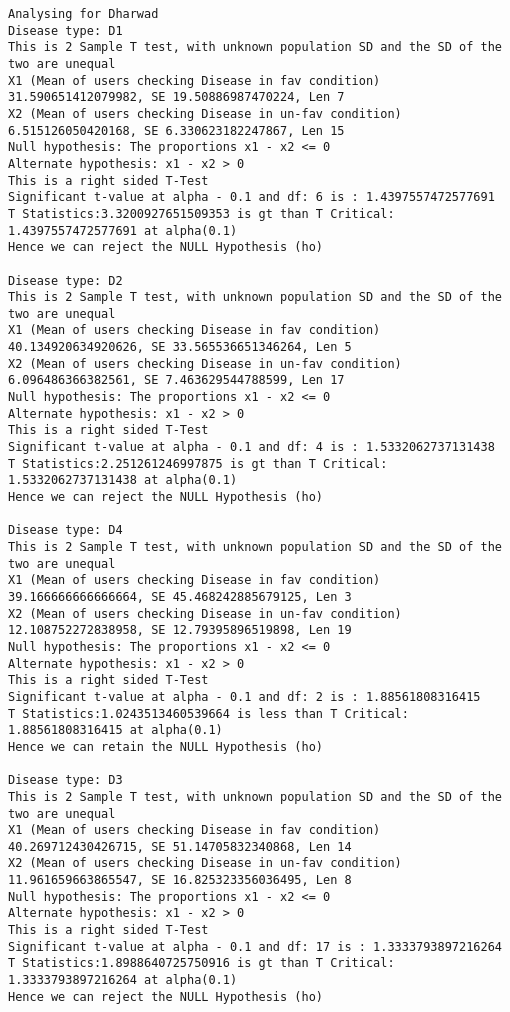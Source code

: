 \documentclass[11pt]{article}
\begin{document}
    \begin{Verbatim}[commandchars=\\\{\}]
Analysing for Dharwad
Disease type: D1
This is 2 Sample T test, with unknown population SD and the SD of the two are unequal
X1 (Mean of users checking Disease in fav condition) 31.590651412079982, SE 19.50886987470224, Len 7
X2 (Mean of users checking Disease in un-fav condition) 6.515126050420168, SE 6.330623182247867, Len 15
Null hypothesis: The proportions x1 - x2 <= 0
Alternate hypothesis: x1 - x2 > 0
This is a right sided T-Test
Significant t-value at alpha - 0.1 and df: 6 is : 1.4397557472577691
T Statistics:3.3200927651509353 is gt than T Critical: 1.4397557472577691 at alpha(0.1)
Hence we can reject the NULL Hypothesis (ho)

Disease type: D2
This is 2 Sample T test, with unknown population SD and the SD of the two are unequal
X1 (Mean of users checking Disease in fav condition) 40.134920634920626, SE 33.565536651346264, Len 5
X2 (Mean of users checking Disease in un-fav condition) 6.096486366382561, SE 7.463629544788599, Len 17
Null hypothesis: The proportions x1 - x2 <= 0
Alternate hypothesis: x1 - x2 > 0
This is a right sided T-Test
Significant t-value at alpha - 0.1 and df: 4 is : 1.5332062737131438
T Statistics:2.251261246997875 is gt than T Critical: 1.5332062737131438 at alpha(0.1)
Hence we can reject the NULL Hypothesis (ho)

Disease type: D4
This is 2 Sample T test, with unknown population SD and the SD of the two are unequal
X1 (Mean of users checking Disease in fav condition) 39.166666666666664, SE 45.468242885679125, Len 3
X2 (Mean of users checking Disease in un-fav condition) 12.108752272838958, SE 12.79395896519898, Len 19
Null hypothesis: The proportions x1 - x2 <= 0
Alternate hypothesis: x1 - x2 > 0
This is a right sided T-Test
Significant t-value at alpha - 0.1 and df: 2 is : 1.88561808316415
T Statistics:1.0243513460539664 is less than T Critical: 1.88561808316415 at alpha(0.1)
Hence we can retain the NULL Hypothesis (ho)

Disease type: D3
This is 2 Sample T test, with unknown population SD and the SD of the two are unequal
X1 (Mean of users checking Disease in fav condition) 40.269712430426715, SE 51.14705832340868, Len 14
X2 (Mean of users checking Disease in un-fav condition) 11.961659663865547, SE 16.825323356036495, Len 8
Null hypothesis: The proportions x1 - x2 <= 0
Alternate hypothesis: x1 - x2 > 0
This is a right sided T-Test
Significant t-value at alpha - 0.1 and df: 17 is : 1.3333793897216264
T Statistics:1.8988640725750916 is gt than T Critical: 1.3333793897216264 at alpha(0.1)
Hence we can reject the NULL Hypothesis (ho)


\end{Verbatim}
\end{document}
